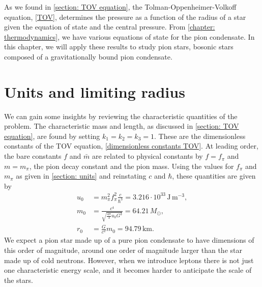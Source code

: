 As we found in \autoref{section: TOV equation}, the Tolman-Oppenheimer-Volkoff equation, \autoref{TOV}, determines the pressure as a function of the radius of a star given the equation of state and the central pressure.
From \autoref{chapter: thermodynamics}, we have various equations of state for the pion condensate.
In this chapter, we will apply these results to study pion stars, bosonic stars composed of a gravitationally bound pion condensate.



\section{Units and limiting radius}

We can gain some insights by reviewing the characteristic quantities of the problem.
The characteristic mass and length, as discussed in \autoref{section: TOV equation}, are found by setting $k_1 = k_2 = k_3 = 1$.
These are the dimensionless constants of the TOV equation, \autoref{dimensionless constants TOV}.
At leading order, the bare constants $f$ and $\bar m$ are related to physical constants by $f = f_\pi$ and $m = m_\pi$, the pion decay constant and the pion mass.
Using the values for $f_\pi$ and $m_\pi$ as given in \autoref{section: units} and reinstating $c$ and $\hbar$, these quantities are given by
%
\begin{align}
    u_0 & =m_\pi^2 f_\pi^2 \frac{c}{\hbar^3}
    = 3.216\cdot 10^{33} \, \text{J}\,\text{m}^{-3}, \\
    m_0 & = \frac{c^4}{\sqrt{\frac{4 \pi}{ 3} u_0 G^3}} = 64.21\, M_\odot, \\
    r_0 & = \frac{G}{c^2} m_0 = 94.79 \, \text{km}.
\end{align}
%
We expect a pion star made up of a pure pion condensate to have dimensions of this order of magnitude, around one order of magnitude larger than the star made up of cold neutrons.
However, when we introduce leptons there is not just one characteristic energy scale, and it becomes harder to anticipate the scale of the stars.



